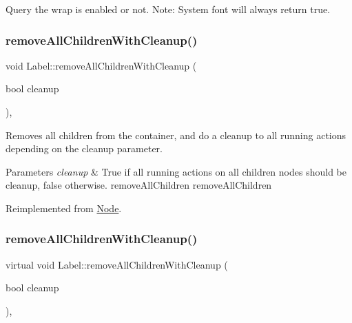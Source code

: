 Query the wrap is enabled or not. Note\+: System font will always return true. \mbox{\label{classLabel_a085855ab76a711d7314ae6ae6ce44c47}} 
\subsubsection{\texorpdfstring{remove\+All\+Children\+With\+Cleanup()}{removeAllChildrenWithCleanup()}\hspace{0.1cm}{\footnotesize\ttfamily [1/2]}}
{\footnotesize\ttfamily void Label\+::remove\+All\+Children\+With\+Cleanup (\begin{DoxyParamCaption}\item[{bool}]{cleanup }\end{DoxyParamCaption})\hspace{0.3cm}{\ttfamily [override]}, {\ttfamily [virtual]}}

Removes all children from the container, and do a cleanup to all running actions depending on the cleanup parameter.


\begin{DoxyParams}{Parameters}
{\em cleanup} & True if all running actions on all children nodes should be cleanup, false otherwise.  remove\+All\+Children  remove\+All\+Children \\
\hline
\end{DoxyParams}


Reimplemented from \hyperlink{classNode_aca66e2b385c3dbf1a6f55627c4a13192}{Node}.

\mbox{\label{classLabel_a5ea31447a69e1a0974aee74ad9a072e2}} 
\subsubsection{\texorpdfstring{remove\+All\+Children\+With\+Cleanup()}{removeAllChildrenWithCleanup()}\hspace{0.1cm}{\footnotesize\ttfamily [2/2]}}
{\footnotesize\ttfamily virtual void Label\+::remove\+All\+Children\+With\+Cleanup (\begin{DoxyParamCaption}\item[{bool}]{cleanup }\end{DoxyParamCaption})\hspace{0.3cm}{\ttfamily [override]}, {\ttfamily [virtual]}}

